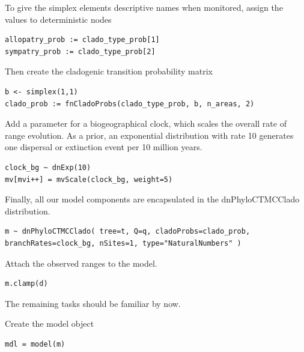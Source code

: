 To give the simplex elements descriptive names when monitored, assign the values to deterministic nodes

\begin{snugshade}
\begin{lstlisting}
allopatry_prob := clado_type_prob[1]
sympatry_prob := clado_type_prob[2]
\end{lstlisting}
\end{snugshade}

Then create the cladogenic transition probability matrix

\begin{snugshade}
\begin{lstlisting}
b <- simplex(1,1)
clado_prob := fnCladoProbs(clado_type_prob, b, n_areas, 2)
\end{lstlisting}
\end{snugshade}

Add a parameter for a biogeographical clock, which scales the overall rate of range evolution.
As a prior, an exponential distribution with rate 10 generates one dispersal or extinction event per 10 million years.

\begin{snugshade}
\begin{lstlisting}
clock_bg ~ dnExp(10)
mv[mvi++] = mvScale(clock_bg, weight=5)
\end{lstlisting}
\end{snugshade}

Finally, all our model components are encapsulated in the dnPhyloCTMCClado distribution.

\begin{snugshade}
\begin{lstlisting}
m ~ dnPhyloCTMCClado( tree=t, Q=q, cladoProbs=clado_prob, branchRates=clock_bg, nSites=1, type="NaturalNumbers" )
\end{lstlisting}
\end{snugshade}

Attach the observed ranges to the model.

\begin{snugshade}
\begin{lstlisting}
m.clamp(d)
\end{lstlisting}
\end{snugshade}

The remaining tasks should be familiar by now.

Create the model object

\begin{snugshade}
\begin{lstlisting}
mdl = model(m)
\end{lstlisting}
\end{snugshade}

